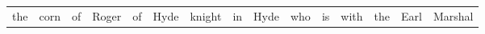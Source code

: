 

\begin{tabular}{ccccccccccccccc}
    the & corn & of & Roger & of & Hyde & knight & in & Hyde & who & is & with & the & Earl & Marshal \\
\end{tabular}

